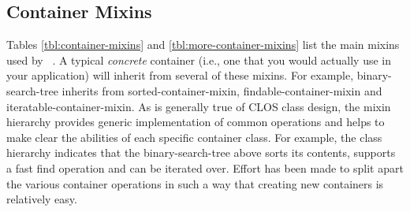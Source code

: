 \documentclass{acm_proc_article-sp}
\begin{document}
\subsection{Container Mixins}
Tables \ref{tbl:container-mixins} and \ref{tbl:more-container-mixins}
list the main mixins used by \clcl~. A typical \emph{concrete} container
(i.e., one that you would actually use in your application) will inherit
from several of these mixins. For example, binary-search-tree inherits
from sorted-container-mixin, findable-container-mixin
and iteratable-container-mixin. As is generally true of CLOS class
design, the mixin hierarchy provides generic implementation of common
operations and helps to make clear the abilities of each specific
container class. For example, the class hierarchy indicates that the
binary-search-tree above sorts its contents, supports a fast find
operation and can be iterated over. Effort has been made to split apart
the various container operations in such a way that creating new
containers is relatively easy. 
\end{document}
